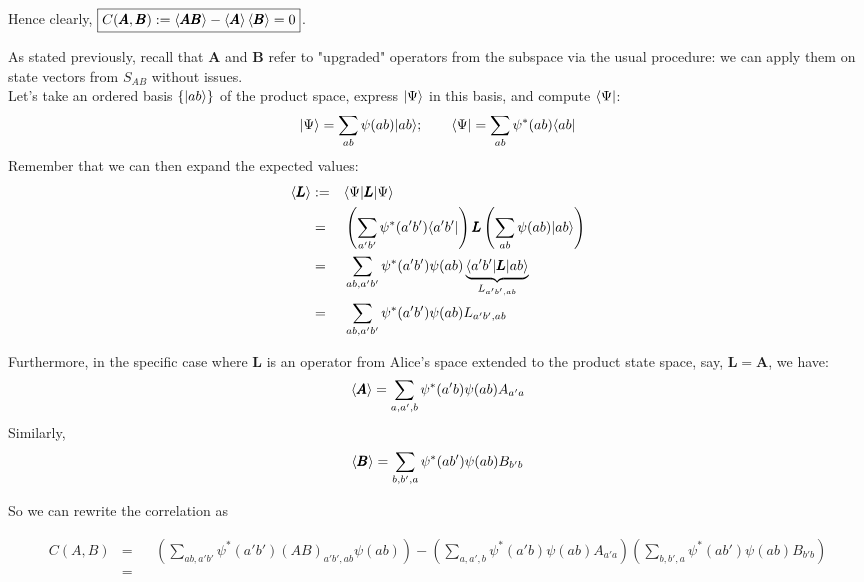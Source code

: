 \documentclass[solutions.tex]{subfiles}
\begin{document}
Hence clearly, $\boxed{C(\pmb{A},\pmb{B}) :=
\left\langle \pmb{AB} \right\rangle - \left\langle \pmb{A} \right\rangle\left\langle \pmb{B} \right\rangle = 0}$.


\iffalse
\hr

As stated previously, recall that $\bm{A}$ and $\bm{B}$ refer
to "upgraded" operators from the subspace via the usual procedure:
we can apply them on state vectors from $S_{AB}$ without issues. \\

Let's take an ordered basis  $\{|ab\rangle\}$ of the product space,
express $|\Psi\rangle$ in this basis, and compute $\langle \Psi|$:
\[
	|\Psi\rangle = \sum_{ab}\psi(ab)|ab\rangle;\qquad
		\langle \Psi| = \sum_{ab}\psi^*(ab)\langle ab|
\]
Remember that we can then expand the expected values:
\begin{equation*}\begin{aligned}
	\left\langle \pmb{L} \right\rangle &:=&& \langle \Psi|\pmb{L}|\Psi\rangle \\
	~ &=&&
		\left(\sum_{a'b'}\psi^*(a'b')\langle a'b'|\right)
		\pmb{L}
		\left(\sum_{ab}\psi(ab)|ab\rangle\right) \\
	~ &=&& \sum_{ab,a'b'} \psi^*(a'b')\psi(ab)
		\underbrace{\langle a'b'|\pmb{L}|ab\rangle}_{L_{a'b',ab}} \\
	~ &=&& \sum_{ab,a'b'} \psi^*(a'b')\psi(ab)L_{a'b',ab} \\
\end{aligned}\end{equation*}

Furthermore, in the specific case where $\bm{L}$ is an operator
from Alice's space extended to the product state space, say, $\bm{L} = \bm{A}$,
we have:
\[
	\left\langle \pmb{A} \right\rangle = \sum_{a,a',b}\psi^*(a'b)\psi(ab)A_{a'a}
\]
Similarly,
\[
	\left\langle \pmb{B} \right\rangle = \sum_{b,b',a}\psi^*(ab')\psi(ab)B_{b'b}
\]

So we can rewrite the correlation as

\begin{equation*}\begin{aligned}
	C(A, B) &=&& \left(\sum_{ab,a'b'}\psi^*(a'b')(AB)_{a'b',ab}\psi(ab)\right)
		-\left(
			\sum_{a,a',b}\psi^*(a'b)\psi(ab)A_{a'a}
		\right)
		\left(
			\sum_{b,b',a}\psi^*(ab')\psi(ab)B_{b'b}
		\right)
		\\
	~ &=&&
\end{aligned}\end{equation*}
\end{document}
